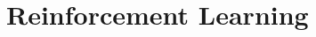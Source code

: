 \documentclass[a4paper, 12pt]{extarticle}
\begin{document}
% 


% 

% 

\section{Reinforcement Learning} %
\label{sec:reinforcement_learning}



\end{document}
